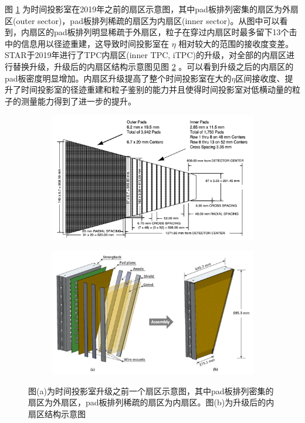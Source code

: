 图 \ref{fig:TPC_sector} 为时间投影室在2019年之前的扇区示意图，其中pad板排列密集的扇区为外扇区(outer sector)，pad板排列稀疏的扇区为内扇区(inner sector)。从图中可以看到，内扇区的pad板排列明显稀疏于外扇区，粒子在穿过内扇区时最多留下13个击中的信息用以径迹重建，这导致时间投影室在 $\eta$ 相对较大的范围的接收度变差。STAR于2019年进行了TPC内扇区(inner TPC, iTPC)的升级，对全部的内扇区进行替换升级，升级后的内扇区结构示意图见图 \ref{fig:iTPC} 。可以看到升级之后的内扇区的pad板密度明显增加。内扇区升级提高了整个时间投影室在大的$\eta$区间接收度、提升了时间投影室的径迹重建和粒子鉴别的能力并且使得时间投影室对低横动量的粒子的测量能力得到了进一步的提升。

\begin{figure}[htb]
    \centering
    \begin{subfigure}[b]{0.47\textwidth}
        \centering
        \includegraphics[width=\textwidth,clip]{figures/Chapter2/MWPC.png}
        \caption{}
        \label{fig:TPC_sector}
    \end{subfigure}
    \hfill
    \begin{subfigure}[b]{0.47\textwidth}
        \centering
        \includegraphics[width=\textwidth,clip]{figures/Chapter2/iTPC.png}
        \caption{}
        \label{fig:iTPC}
    \end{subfigure}
       \caption[TPC扇区示意图与iTPC升级后结构示意图]{图(a)为时间投影室升级之前一个扇区示意图，其中pad板排列密集的扇区为外扇区，pad板排列稀疏的扇区为内扇区。图(b)为升级后的内扇区结构示意图}
       \label{fig:MWPC}
\end{figure}

